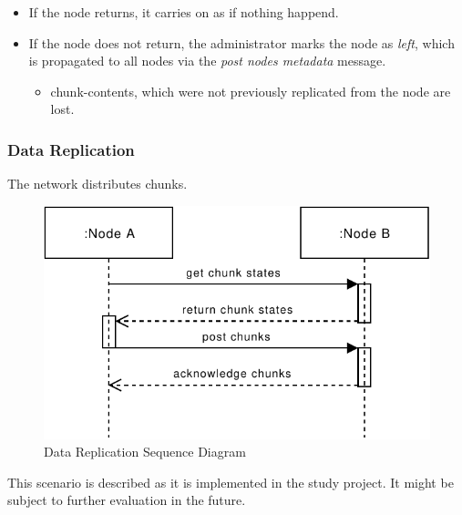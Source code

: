 \begin{itemize}
    \item If the \gls{node} returns, it carries on as if nothing happend.
    \item If the \gls{node} does not return, the \gls{administrator} marks the node as \emph{left}, which is propagated to all \glspl{node} via the \emph{post nodes metadata} message.
        \begin{itemize}
            \item \glspl{chunk-content}, which were not previously replicated from the \gls{node} are lost.
        \end{itemize}
\end{itemize}

\subsubsection{Data Replication}\label{sec:scenario-data-replication}
The network distributes \glspl{chunk}.

\begin{figure}[h]
    \centering
    \includegraphics[width=0.6\linewidth]{resources/data_replication.pdf}
    \caption{Data Replication Sequence Diagram}
    \label{fig:data-replication}
\end{figure}

This scenario is described as it is implemented in the study project. It might be subject to further evaluation in the future.

